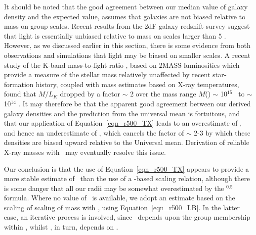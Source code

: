 \documentclass[usenatbib]{mn2e}
\begin{document}
It should be noted that the good agreement between our median value of galaxy
density and the expected value, assumes that galaxies are not biased relative to
mass on group scales. Recent results from the 2dF galaxy redshift survey
\citep{verde02} suggest that light is essentially unbiased relative to mass on
scales larger than 5 \Mpc. However, as we discussed earlier in this section,
there is some evidence from both observations and simulations
\citep[e.g.][]{bahcall02,benson00} that light may be biased on smaller scales. A
recent study of the K-band mass-to-light ratio \citep*{lin03}, based on 2MASS
luminosities which provide a measure of the stellar mass relatively unaffected
by recent star-formation history, coupled with mass estimates based on X-ray
temperatures, found that $M/L_K$ dropped by a factor $\sim$ 2 over the mass range
$M$(\rfh) $\sim$ 10$^{15}$ \Msol\ to $\sim$ 10$^{14}$ \Msol.  It may therefore be
that the apparent good agreement between our derived galaxy densities and the
prediction from the universal mean is fortuitous, and that our application of
Equation~\ref{eqn_r500_TX} leads to an overestimate of \rfh, and hence an
underestimate of \dengal, which cancels the factor of $\sim$ 2-3 by which these
densities are biased upward relative to the Universal mean. Derivation of
reliable X-ray masses with \XMM\ may eventually resolve this issue.

Our conclusion is that the use of Equation~\ref{eqn_r500_TX} appears to provide
a more stable estimate of \rfh\ than the use of a \sigmav-based scaling relation,
although there is some danger that all our radii may be somewhat overestimated by
the \TX$^{0.5}$ formula.  Where no value of \TX\ is available, we adopt an
estimate based on the scaling of  scaling of mass with \LB, using
Equation~\ref{eqn_r500_LB}.  In the latter case, an iterative process is
involved, since \LB\ depends upon the group membership within \rfh, whilst \rfh,
in turn, depends on \LB.
\end{document}
